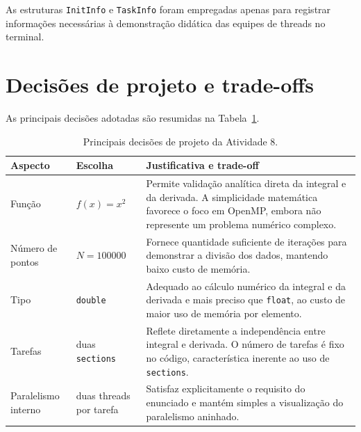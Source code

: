 As estruturas \texttt{InitInfo} e \texttt{TaskInfo} foram empregadas apenas
para registrar informações necessárias à demonstração didática das equipes de
threads no terminal.


\section{Decisões de projeto e trade-offs}
\label{sec:atvd08-decisoes}

As principais decisões adotadas são resumidas na
Tabela~\ref{tab:atvd08-decisoes}.

\begin{table}[htbp]
    \centering
    \small
    \caption{Principais decisões de projeto da Atividade 8.}
    \label{tab:atvd08-decisoes}
    \begin{tabular}{
        |p{}
        |p{}
        |p{}|}
        \hline
        \textbf{Aspecto} &
        \textbf{Escolha} &
        \textbf{Justificativa e trade-off} \\
        \hline

        Função &
        $f(x)=x^2$ &
        Permite validação analítica direta da integral e da derivada. A
        simplicidade matemática favorece o foco em OpenMP, embora não
        represente um problema numérico complexo. \\
        \hline

        Número de pontos &
        $N=100000$ &
        Fornece quantidade suficiente de iterações para demonstrar a divisão
        dos dados, mantendo baixo custo de memória. \\
        \hline

        Tipo &
        \texttt{double} &
        Adequado ao cálculo numérico da integral e da derivada e mais preciso
        que \texttt{float}, ao custo de maior uso de memória por elemento. \\
        \hline

        Tarefas &
        duas \texttt{sections} &
        Reflete diretamente a independência entre integral e derivada. O
        número de tarefas é fixo no código, característica inerente ao uso
        de \texttt{sections}. \\
        \hline

        Paralelismo interno &
        duas threads por tarefa &
        Satisfaz explicitamente o requisito do enunciado e mantém simples a
        visualização do paralelismo aninhado. \\
        \hline


\end{tabular}
\end{table}
